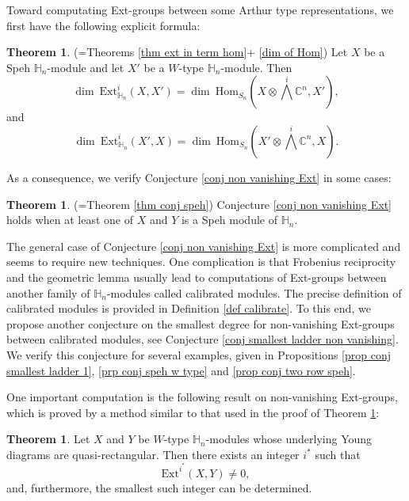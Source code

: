 \documentclass[11pt]{amsart}
\numberwithin{equation}{section}
\theoremstyle{definition}
\newtheorem{theorem}[thm]{Theorem}
\begin{document}
Toward computating Ext-groups between some Arthur type representations, we first have the following explicit formula:

\begin{theorem} \label{thm ext formula young diagram} (=Theorems \ref{thm ext in term hom}+ \ref{dim of Hom}) 
Let $X$ be a Speh  $\mathbb H_n$-module and let $X'$ be a $W$-type  $\mathbb H_n$-module. Then
\[ \dim~\mathrm{Ext}^i_{\mathbb H_n}(X, X') =\dim~\mathrm{Hom}_{S_n}(X \otimes \bigwedge^i\mathbb C^n , X'), \]
and
\[ \dim~\mathrm{Ext}^i_{\mathbb H_n}(X', X) = \dim~\mathrm{Hom}_{S_n}(X'\otimes \bigwedge^i \mathbb C^n, X) .
\]
\end{theorem}




As a consequence, we verify Conjecture \ref{conj non vanishing Ext} in some cases:


\begin{theorem} (=Theorem \ref{thm conj speh}) \label{thm speh module hn}
Conjecture \ref{conj non vanishing Ext} holds when at least one of $X$ and $Y$ is a Speh module of $\mathbb H_n$.
\end{theorem}












The general case of Conjecture \ref{conj non vanishing Ext} is more complicated and seems to require new techniques. One complication is that Frobenius reciprocity and the geometric lemma usually lead to computations of Ext-groups between another family of $\mathbb H_n$-modules called calibrated modules. The precise definition of calibrated modules is provided in Definition \ref{def calibrate}. To this end, we propose another conjecture on the smallest degree for non-vanishing Ext-groups between calibrated modules, see Conjecture \ref{conj smallest ladder non vanishing}. We verify this conjecture for several examples, given in Propositions \ref{prop conj smallest ladder 1}, \ref{prp conj speh w type} and \ref{prop conj two row speh}.

One important computation is the following result on non-vanishing Ext-groups, which is proved by a method similar to that used in the proof of Theorem \ref{thm ext formula young diagram}:

\begin{theorem}  \label{thm ext smallest}
Let $X$ and $Y$ be $W$-type $\mathbb H_n$-modules whose underlying Young diagrams are quasi-rectangular. Then there exists an integer $i^*$ such that 
\[   \mathrm{Ext}^{i^*}(X, Y) \neq 0,
\]
and, furthermore, the smallest such integer can be determined.
\end{theorem}
\end{document}
